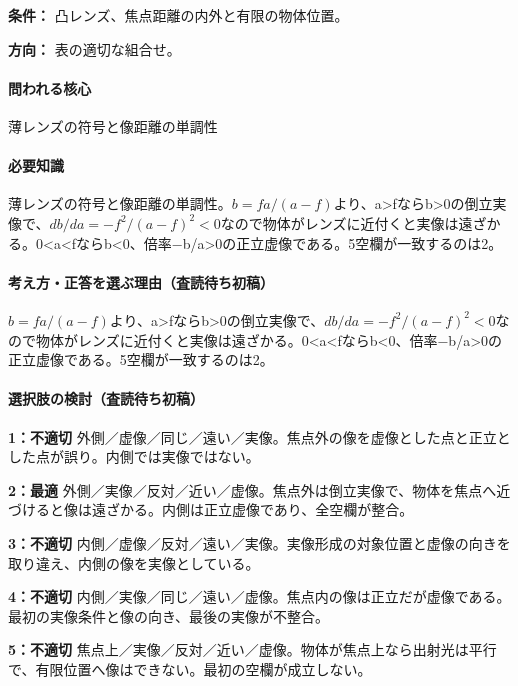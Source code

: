 \noindent\textbf{条件：} 凸レンズ、焦点距離の内外と有限の物体位置。\par

\noindent\textbf{方向：} 表の適切な組合せ。\par

\paragraph{問われる核心} 薄レンズの符号と像距離の単調性

\paragraph{必要知識} 薄レンズの符号と像距離の単調性。\(b=fa/(a-f)\)より、a>fならb>0の倒立実像で、\(db/da=-f^2/(a-f)^2<0\)なので物体がレンズに近付くと実像は遠ざかる。0<a<fならb<0、倍率−b/a>0の正立虚像である。5空欄が一致するのは2。

\paragraph{考え方・正答を選ぶ理由（査読待ち初稿）} \(b=fa/(a-f)\)より、a>fならb>0の倒立実像で、\(db/da=-f^2/(a-f)^2<0\)なので物体がレンズに近付くと実像は遠ざかる。0<a<fならb<0、倍率−b/a>0の正立虚像である。5空欄が一致するのは2。

\paragraph{選択肢の検討（査読待ち初稿）}\mbox{}\par

\noindent\textbf{1：不適切} 外側／虚像／同じ／遠い／実像。焦点外の像を虚像とした点と正立とした点が誤り。内側では実像ではない。\par

\noindent\textbf{2：最適} 外側／実像／反対／近い／虚像。焦点外は倒立実像で、物体を焦点へ近づけると像は遠ざかる。内側は正立虚像であり、全空欄が整合。\par

\noindent\textbf{3：不適切} 内側／虚像／反対／遠い／実像。実像形成の対象位置と虚像の向きを取り違え、内側の像を実像としている。\par

\noindent\textbf{4：不適切} 内側／実像／同じ／遠い／虚像。焦点内の像は正立だが虚像である。最初の実像条件と像の向き、最後の実像が不整合。\par

\noindent\textbf{5：不適切} 焦点上／実像／反対／近い／虚像。物体が焦点上なら出射光は平行で、有限位置へ像はできない。最初の空欄が成立しない。\par

